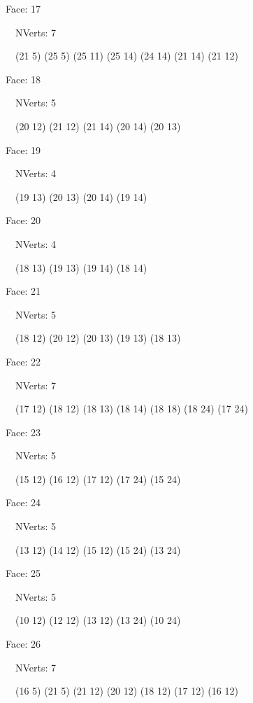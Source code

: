 \documentclass{article}
\begin{document}
{\footnotesize 

Face: 17

\   \    NVerts: 7

 \   \   (21 5) (25 5) (25 11) (25 14) (24 14) (21 14) (21 12)}

{\footnotesize 

Face: 18

\   \    NVerts: 5

 \   \   (20 12) (21 12) (21 14) (20 14) (20 13)}

{\footnotesize 

Face: 19

\   \    NVerts: 4

 \   \   (19 13) (20 13) (20 14) (19 14)}

{\footnotesize 

Face: 20

\   \    NVerts: 4

 \   \   (18 13) (19 13) (19 14) (18 14)}

{\footnotesize 

Face: 21

\   \    NVerts: 5

 \   \   (18 12) (20 12) (20 13) (19 13) (18 13)}

{\footnotesize 

Face: 22

\   \    NVerts: 7

 \   \   (17 12) (18 12) (18 13) (18 14) (18 18) (18 24) (17 24)}

{\footnotesize 

Face: 23

\   \    NVerts: 5

 \   \   (15 12) (16 12) (17 12) (17 24) (15 24)}

{\footnotesize 

Face: 24

\   \    NVerts: 5

 \   \   (13 12) (14 12) (15 12) (15 24) (13 24)}

{\footnotesize 

Face: 25

\   \    NVerts: 5

 \   \   (10 12) (12 12) (13 12) (13 24) (10 24)}

{\footnotesize 

Face: 26

\   \    NVerts: 7

 \   \   (16 5) (21 5) (21 12) (20 12) (18 12) (17 12) (16 12)}
\end{document}
